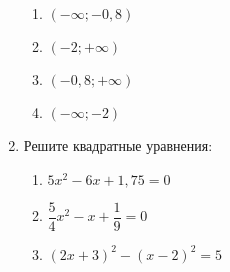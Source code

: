 \documentclass[12pt, a4paper]{article}
\begin{document}
\begin{enumerate}
		\begin{multicols}{2}
			\begin{enumerate}[label=\arabic*)]
				\item $(-\infty;-0,8)$
				\item $(-2;+\infty)$
				\item $(-0,8;+\infty)$
				\item $(-\infty;-2)$
			\end{enumerate}
		\end{multicols}
		\item Решите квадратные уравнения:
		\begin{multicols}{2}
			\begin{enumerate}[label=\asbuk*)]
			\item $5x^2-6x+1,75=0$
			\item $\dfrac{5}{4}x^2-x+\dfrac{1}{9}=0$
			\item $(2x+3)^2-(x-2)^2=5$
			\end{enumerate}
		\end{multicols}
	\end{enumerate}
\end{document}
